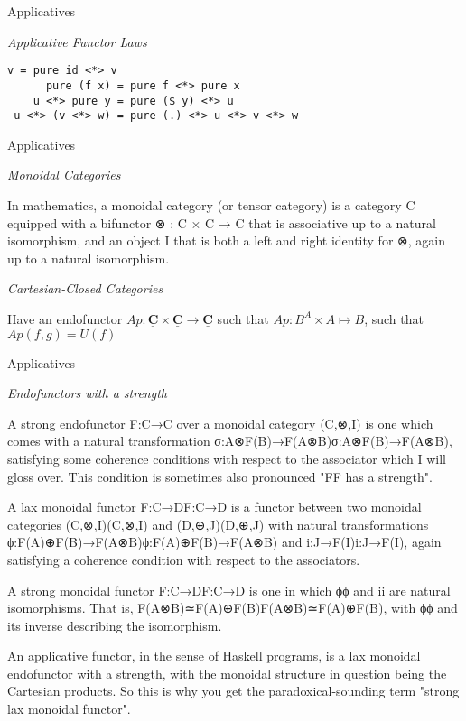 \documentclass[10pt]{beamer}
\newcommand{\Cat}[1]{\ensuremath{\underline{\mathbf{#1}}}}
\theoremstyle{definition}
\theoremstyle{remark}
\numberwithin{equation}{section}
\begin{document}
\begin{frame}[fragile]{Applicatives}

  \emph{Applicative Functor Laws}

  \begin{lstlisting}[frame=single]
               v = pure id <*> v
      pure (f x) = pure f <*> pure x
    u <*> pure y = pure ($ y) <*> u
 u <*> (v <*> w) = pure (.) <*> u <*> v <*> w
  \end{lstlisting}

\end{frame}

\begin{frame}[fragile]{Applicatives}

  \emph{Monoidal Categories}

  In mathematics, a monoidal category (or tensor category) is a category C equipped with a bifunctor
⊗ : C × C → C
  that is associative up to a natural isomorphism, and an object I that is both a left and right identity for ⊗, again up to a natural isomorphism.

  \emph{Cartesian-Closed Categories}

  Have an endofunctor $Ap : \Cat{C}\times\Cat{C} \rightarrow \Cat{C}$ such that $Ap : B^A \times A \mapsto B$, such that $ Ap(f,g) = U(f)$

\end{frame}

\begin{frame}[fragile]{Applicatives}

  \emph{Endofunctors with a strength}

  A strong endofunctor F:C→C over a monoidal category (C,⊗,I) is one which comes with a natural transformation σ:A⊗F(B)→F(A⊗B)σ:A⊗F(B)→F(A⊗B), satisfying some coherence conditions with respect to the associator which I will gloss over. This condition is sometimes also pronounced "FF has a strength".

  A lax monoidal functor F:C→DF:C→D is a functor between two monoidal categories (C,⊗,I)(C,⊗,I) and (D,⊕,J)(D,⊕,J) with natural transformations ϕ:F(A)⊕F(B)→F(A⊗B)ϕ:F(A)⊕F(B)→F(A⊗B) and i:J→F(I)i:J→F(I), again satisfying a coherence condition with respect to the associators.

  A strong monoidal functor F:C→DF:C→D is one in which ϕϕ and ii are natural isomorphisms. That is, F(A⊗B)≃F(A)⊕F(B)F(A⊗B)≃F(A)⊕F(B), with ϕϕ and its inverse describing the isomorphism.

  An applicative functor, in the sense of Haskell programs, is a lax monoidal endofunctor with a strength, with the monoidal structure in question being the Cartesian products. So this is why you get the paradoxical-sounding term "strong lax monoidal functor".
\end{frame}
\end{document}
